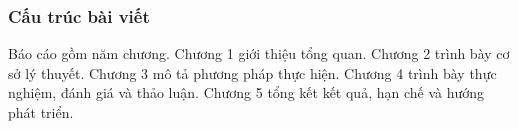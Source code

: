 \subsubsection{Cấu trúc bài viết}\label{cau-truc-bai-viet}

Báo cáo gồm năm chương. Chương 1 giới thiệu tổng quan. Chương 2 trình bày cơ sở lý thuyết. Chương 3 mô tả phương pháp thực hiện. Chương 4 trình bày thực nghiệm, đánh giá và thảo luận. Chương 5 tổng kết kết quả, hạn chế và hướng phát triển.

